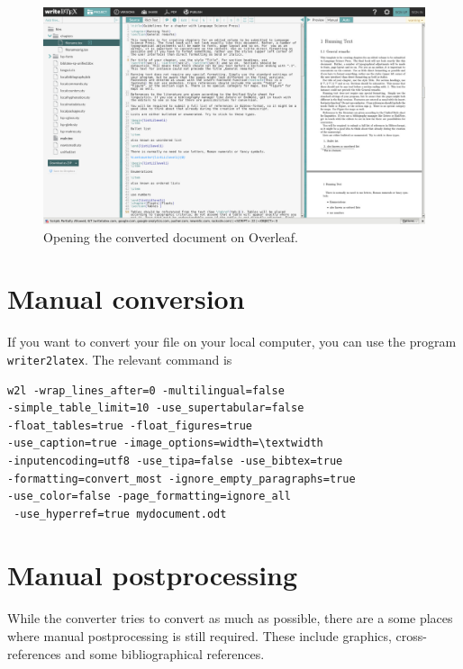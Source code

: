 \begin{figure}
\includegraphics[width=\textwidth]{conversionwritelatex.png} 
\caption{Opening the converted document on Overleaf.}
\label{fig:conversion:overleaf}
\end{figure}

\section{Manual conversion}
If you want to convert your file on your local computer, you can use the program \verb+writer2latex+. The relevant command is 
\begin{verbatim}
w2l -wrap_lines_after=0 -multilingual=false 
-simple_table_limit=10 -use_supertabular=false 
-float_tables=true -float_figures=true 
-use_caption=true -image_options=width=\textwidth 
-inputencoding=utf8 -use_tipa=false -use_bibtex=true  
-formatting=convert_most -ignore_empty_paragraphs=true 
-use_color=false -page_formatting=ignore_all
 -use_hyperref=true mydocument.odt
\end{verbatim}

\section{Manual postprocessing}
While the converter tries to convert as much as possible, there are a some places where manual postprocessing is still required.
These include graphics, cross-references and some bibliographical references.

